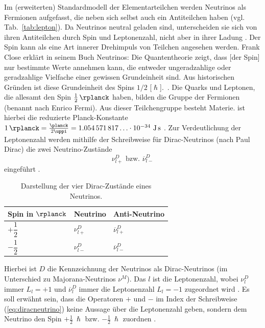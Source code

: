 \documentclass[a4paper,12pt]{article}
\newcommand{\tabref}[1]{Tab.~\ref{#1}}
\begin{document}
Im (erweiterten) Standardmodell der Elementarteilchen \cite[vgl.][285--286]{Zyla2020} werden Neutrinos als Fermionen aufgefasst, die neben sich selbst auch ein Antiteilchen haben (vgl. \tabref{tab:lepton}). Da Neutrinos neutral geladen sind, unterscheiden sie sich von ihren Antiteilchen durch Spin und Leptonenzahl, nicht aber in ihrer Ladung \cite[13]{Athar2022}. Der Spin kann als eine Art innerer Drehimpuls von Teilchen angesehen werden. Frank Close erklärt in seinem Buch \glqq Neutrinos\grqq : \glqq Die Quantentheorie zeigt, dass [der Spin] nur bestimmte Werte annehmen kann, die entweder ungeradzahlige oder geradzahlige Vielfache einer gewissen Grundeinheit sind. Aus historischen Gründen ist diese Grundeinheit des Spins $1/2$ [$\mathrm{\hslash}$].\grqq \ \cite[29]{Close2012}. Die Quarks und Leptonen, die allesamt den Spin $\qty[parse-numbers=false]{\frac{1}{2}}{\rplanck}$ haben, bilden die Gruppe der Fermionen (benannt nach Enrico Fermi). Aus dieser Teilchengruppe besteht Materie. \unit{\rplanck} ist hierbei die reduzierte Planck-Konstante $\qty{1}{\rplanck} = \frac{\unit{\planck}}{2\uppi} = \num{1,054571817}\ldots\cdot 10^{-34} \ \unit{\joule\second}$ \cite[1347]{Tipler2024}. Zur Verdeutlichung der Leptonenzahl werden mithilfe der Schreibweise für Dirac-Neutrinos (nach Paul Dirac) die zwei Neutrino-Zustände
\begin{equation}
\nu^D_{l+} \text{ bzw. } \overline{\nu}^D_{l-}
\label{eq:diracneutrino}
\end{equation}   
eingeführt \cite[13]{Athar2022} \cite[23--25]{Athar2020}. 
\begin{table}[b!]
\centering
\renewcommand{\arraystretch}{1.2}
\begin{tabularx}{.7\textwidth}{YYY}
Spin in $\unit{\rplanck}$ & Neutrino & Anti-Neutrino \\
 \midrule
$+ \dfrac{1}{2}$ & $\nu^D_{l+}$ & $\overline{\nu}^D_{l+}$ \\
\addlinespace
$- \dfrac{1}{2}$& $\nu^D_{l-}$ & $\overline{\nu}^D_{l-}$ \\
\bottomrule
\end{tabularx}
\caption[Darstellung der vier Dirac-Zustände eines Neutrinos. -- Quelle: Autor.]{Darstellung der vier Dirac-Zustände eines Neutrinos.}
\label{tab:dirac}
\renewcommand{\arraystretch}{1}
\end{table} Hierbei ist $D$ die Kennzeichnung der Neutrinos als Dirac-Neutrinos (im Unterschied zu Majorana-Neutrinos $\nu^M$). Das $l$ ist die Leptonenzahl, wobei $\nu^D_{l}$ immer $L_l=+1$ und $\overline{\nu}^D_{l}$ immer die Leptonenzahl $L_l=-1$ zugeordnet wird \cite[13]{Athar2022}. Es soll erwähnt sein, dass die Operatoren $+$ und $-$ im Index der Schreibweise (\ref{eq:diracneutrino}) keine Aussage über die Leptonenzahl geben, sondern dem Neutrino den Spin $+ \frac{1}{2} \ \hslash$ bzw. $- \frac{1}{2} \ \hslash$ zuordnen \cite[13]{Athar2022}. \par 
\end{document}
